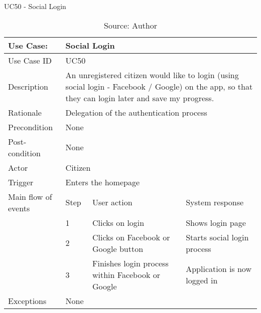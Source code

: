 \begin{table}[h]
\centering
\caption{UC50 - Social Login}
\label{uc:50}
\begin{tabular}{|p{3cm}|p{1cm}|p{5cm}|p{5cm}|}
\hline
Use Case:       & \multicolumn{3}{p{11cm}|}{Social Login} \\ \hline
Use Case ID     & \multicolumn{3}{p{11cm}|}{UC50} \\ \hline
Description     & \multicolumn{3}{p{11cm}|}{An unregistered citizen would like to login (using social login - Facebook / Google) on the app, so that they can login later and save my progress.} \\ \hline
Rationale       & \multicolumn{3}{p{11cm}|}{Delegation of the authentication process} \\ \hline
Precondition    & \multicolumn{3}{p{11cm}|}{None} \\ \hline
Post-condition  & \multicolumn{3}{p{11cm}|}{None} \\ \hline
Actor           & \multicolumn{3}{p{11cm}|}{Citizen} \\ \hline
Trigger         & \multicolumn{3}{p{11cm}|}{Enters the homepage} \\ \hline
Main flow of events & Step  & User action & System response \\ \hline
                    & 1     & Clicks on login & Shows login page \\ \hline
                    & 2     & Clicks on Facebook or Google button & Starts social login process \\ \hline
                    & 3     & Finishes login process within Facebook or Google & Application is now logged in \\ \hline
Exceptions      & \multicolumn{3}{p{11cm}|}{None} \\ \hline
\end{tabular}
\caption*{Source: Author}
\end{table}

